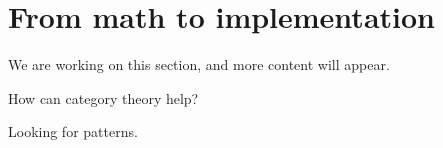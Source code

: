 
\section{From math to implementation}

We are working on this section, and more content will appear.

How can category theory help?

\devel{
}

Looking for patterns.

\devel{



}



